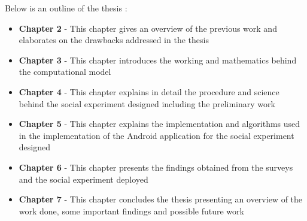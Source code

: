 Below is an outline of the thesis :
\begin{itemize}
\item \textbf{Chapter 2} - This chapter gives an overview of the previous work and elaborates on the drawbacks addressed in the thesis
\item \textbf{Chapter 3} - This chapter introduces the working and mathematics behind the computational model
\item \textbf{Chapter 4} - This chapter explains in detail the procedure and science behind the social experiment designed including the preliminary work
\item \textbf{Chapter 5} - This chapter explains the implementation and algorithms used in the implementation of the Android application for the social experiment designed
\item \textbf{Chapter 6} - This chapter presents the findings obtained from the surveys and the social experiment deployed
\item \textbf{Chapter 7} - This chapter concludes the thesis presenting an overview of the work done, some important findings and possible future work
\end{itemize}






